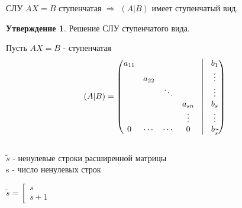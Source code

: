 \documentclass[a4paper, 12pt]{article}
\theoremstyle{definition}
\newtheorem*{subtheorem}{Утверждение}
\begin{document}
  СЛУ $AX=B$ ступенчатая $\Longrightarrow $ $(A|B)$ имеет ступенчатый вид.

  \newpage
  \begin{subtheorem}
    Решение СЛУ ступенчатого вида.
  \end{subtheorem}  
  Пусть $AX=B$ - ступенчатая
  $$(A|B)=\begin{pmatrix}
    a_{11} & \null & \null & \null & \vline & b_1 \\
    \null & a_{22} & \null & \null & \vline & \vdots \\
    \null & \null & \ddots & \null & \vline & \vdots \\
    \null & \null & \null & a_{sn} & \vline & b_s \\
    \null & \null & \null & \vdots & \vline & \vdots \\
    0 & \cdots & \cdots & 0 & \vline & b_{\widetilde{s}}
  \end{pmatrix}$$ \\
  $\widetilde{s}$ - ненулевые строки расширенной матрицы \\
  s - число ненулевых строк 

  $\widetilde{s}=\left[
    \begin{gathered}
      s \\
      s+1
    \end{gathered}
  \right.$
\end{document}

